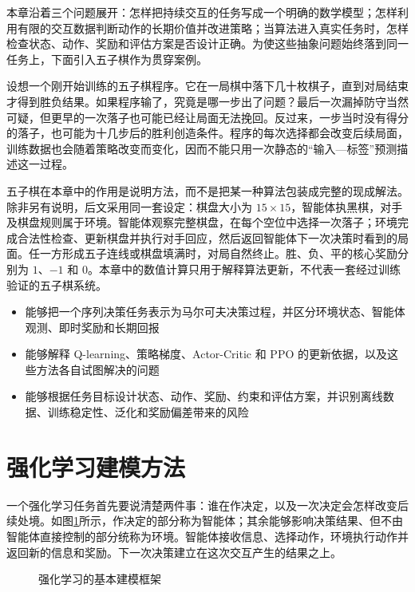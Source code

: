 本章沿着三个问题展开：怎样把持续交互的任务写成一个明确的数学模型；怎样利用有限的交互数据判断动作的长期价值并改进策略；当算法进入真实任务时，怎样检查状态、动作、奖励和评估方案是否设计正确。为使这些抽象问题始终落到同一任务上，下面引入五子棋作为贯穿案例。

设想一个刚开始训练的五子棋程序。它在一局棋中落下几十枚棋子，直到对局结束才得到胜负结果。如果程序输了，究竟是哪一步出了问题？最后一次漏掉防守当然可疑，但更早的一次落子也可能已经让局面无法挽回。反过来，一步当时没有得分的落子，也可能为十几步后的胜利创造条件。程序的每次选择都会改变后续局面，训练数据也会随着策略改变而变化，因而不能只用一次静态的“输入—标签”预测描述这一过程。

五子棋在本章中的作用是说明方法，而不是把某一种算法包装成完整的现成解法。除非另有说明，后文采用同一套设定：棋盘大小为 $15\times15$，智能体执黑棋，对手及棋盘规则属于环境。智能体观察完整棋盘，在每个空位中选择一次落子；环境完成合法性检查、更新棋盘并执行对手回应，然后返回智能体下一次决策时看到的局面。任一方形成五子连线或棋盘填满时，对局自然终止。胜、负、平的核心奖励分别为 $1$、$-1$ 和 $0$。本章中的数值计算只用于解释算法更新，不代表一套经过训练验证的五子棋系统。

\begin{learninggoals}
  \begin{itemize}
    \item 能够把一个序列决策任务表示为马尔可夫决策过程，并区分环境状态、智能体观测、即时奖励和长期回报
    \item 能够解释 Q-learning、策略梯度、Actor-Critic 和 PPO 的更新依据，以及这些方法各自试图解决的问题
    \item 能够根据任务目标设计状态、动作、奖励、约束和评估方案，并识别离线数据、训练稳定性、泛化和奖励偏差带来的风险
  \end{itemize}
\end{learninggoals}

\section{强化学习建模方法}

一个强化学习任务首先要说清楚两件事：谁在作决定，以及一次决定会怎样改变后续处境。如图\ref{fig:framework}所示，作决定的部分称为智能体；其余能够影响决策结果、但不由智能体直接控制的部分统称为环境。智能体接收信息、选择动作，环境执行动作并返回新的信息和奖励。下一次决策建立在这次交互产生的结果之上。

\begin{figure}[htbp]
  \centering
  \caption{强化学习的基本建模框架}
  \label{fig:framework}
\end{figure}

